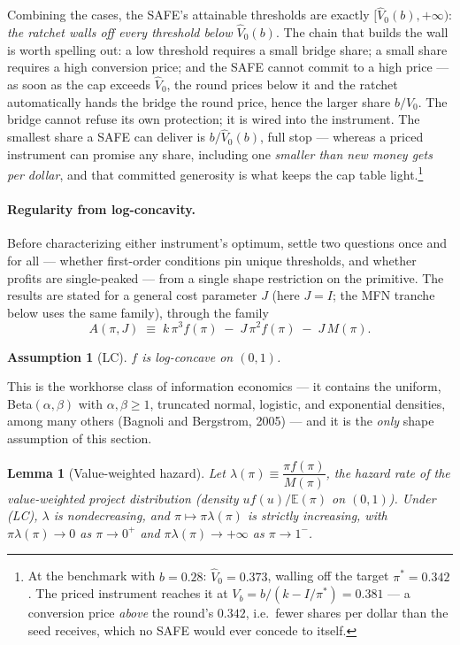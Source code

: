 \documentclass[11pt]{article}
\newtheorem{lemma}{Lemma}
\newtheorem{assumption}{Assumption}
\theoremstyle{definition}
\newcommand{\E}{\mathbb{E}}
\begin{document}
Combining the cases, the SAFE's attainable thresholds are exactly $[\hat V_0(b),+\infty)$: \emph{the ratchet walls off every threshold below $\hat V_0(b)$}. The chain that builds the wall is worth spelling out: a low threshold requires a small bridge share; a small share requires a high conversion price; and the SAFE cannot commit to a high price --- as soon as the cap exceeds $\hat V_0$, the round prices below it and the ratchet automatically hands the bridge the round price, hence the larger share $b/\hat V_0$. The bridge cannot refuse its own protection; it is wired into the instrument. The smallest share a SAFE can deliver is $b/\hat V_0(b)$, full stop --- whereas a priced instrument can promise any share, including one \emph{smaller than new money gets per dollar}, and that committed generosity is what keeps the cap table light.\footnote{At the benchmark with $b=0.28$: $\hat V_0=0.373$, walling off the target $\pi^{*}=0.342$. The priced instrument reaches it at $V_b=b/(k-I/\pi^{*})=0.381$ --- a conversion price \emph{above} the round's $0.342$, i.e.\ fewer shares per dollar than the seed receives, which no SAFE would ever concede to itself.}

\paragraph{Regularity from log-concavity.}
Before characterizing either instrument's optimum, settle two questions once and for all --- whether first-order conditions pin unique thresholds, and whether profits are single-peaked --- from a single shape restriction on the primitive. The results are stated for a general cost parameter $J$ (here $J=I$; the MFN tranche below uses the same family), through the family
\begin{equation}
A(\pi, J)\;\equiv\; k\,\pi^{3}f(\pi)\;-\;J\,\pi^{2}f(\pi)\;-\;J\,M(\pi).
\label{eq:Afamily}
\end{equation}

\begin{assumption}[LC]\label{ass:LC}
$f$ is log-concave on $(0,1)$.
\end{assumption}

This is the workhorse class of information economics --- it contains the uniform, Beta$(\alpha,\beta)$ with $\alpha,\beta\ge1$, truncated normal, logistic, and exponential densities, among many others (Bagnoli and Bergstrom, 2005) --- and it is the \emph{only} shape assumption of this section.

\begin{lemma}[Value-weighted hazard]\label{lem:hazard}
Let $\lambda(\pi)\equiv\dfrac{\pi f(\pi)}{M(\pi)}$, the hazard rate of the value-weighted project distribution (density $u f(u)/\E(\pi)$ on $(0,1)$). Under (LC), $\lambda$ is nondecreasing, and $\pi\mapsto\pi\lambda(\pi)$ is strictly increasing, with $\pi\lambda(\pi)\to0$ as $\pi\to0^{+}$ and $\pi\lambda(\pi)\to+\infty$ as $\pi\to1^{-}$.
\end{lemma}
\end{document}
